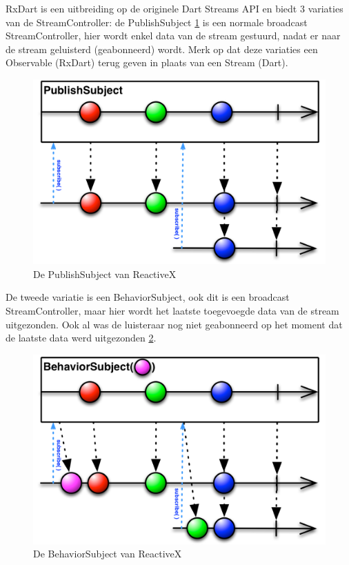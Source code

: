 RxDart is een uitbreiding op de originele Dart Streams API en biedt 3 variaties van de StreamController: 
de PublishSubject \ref{fig:rxdart-publishsubject} is een normale broadcast StreamController, hier wordt enkel data van de stream gestuurd, nadat er naar de stream geluisterd (geabonneerd) wordt.
Merk op dat deze variaties een Observable (RxDart) terug geven in plaats van een Stream (Dart).


\begin{figure}[H]
    \centering
    \includegraphics[width=\figureWidthModifier\linewidth]{img/stand-van-zaken/rxdart-publishsubject.png}
    \caption{De PublishSubject van ReactiveX \autocite{Boelens2018}}
    \label{fig:rxdart-publishsubject}
\end{figure}

De tweede variatie is een BehaviorSubject, ook dit is een broadcast StreamController, maar hier wordt het laatste toegevoegde data van de stream uitgezonden. Ook al was de luisteraar nog niet geabonneerd op het moment dat de laatste data werd uitgezonden \ref{fig:rxdart-behaviorsubject}. 

\begin{figure}[H]
    \centering
    \includegraphics[width=\figureWidthModifier\linewidth]{img/stand-van-zaken/rxdart-behaviorsubject.png}
    \caption{De BehaviorSubject van ReactiveX \autocite{Boelens2018}}
    \label{fig:rxdart-behaviorsubject}
\end{figure}

